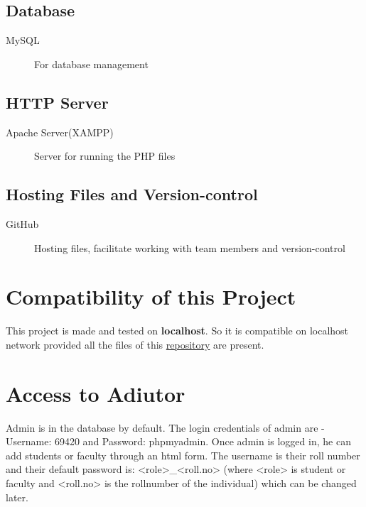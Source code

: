 \documentclass{article}
\begin{document}
\subsection{Database}
\begin{description}
    \item[MySQL] For database management
\end{description}

\subsection{HTTP Server}
\begin{description}
    \item[Apache Server(XAMPP)] Server for running the PHP files
\end{description}

\subsection{Hosting Files and Version-control}
\begin{description}
    \item[GitHub] Hosting files, facilitate working with team members and version-control
\end{description}

\section{Compatibility of this Project}
This project is made and tested on \textbf{localhost}. So it is compatible on localhost network provided all the files of this  \href{https://github.com/samiitdh/SSL_Project}{repository} are present.

\section{Access to Adiutor}
Admin is in the database by default. The login credentials of admin are - Username: 69420 and Password: phpmyadmin. Once admin is logged in, he can add students or faculty through an html form. The username is their roll number and their default password is: <role>\_<roll.no> (where <role> is student or faculty and <roll.no> is the rollnumber of the individual) which can be changed later.
\end{document}
